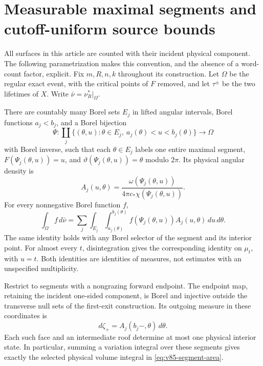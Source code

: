 \section{Measurable maximal segments and cutoff-uniform source bounds}
\label{sec:v85-segments}
All surfaces in this article are counted with their incident physical
component. The following parametrization makes this convention, and the
absence of a word-count factor, explicit. Fix $m,R,n,k$ throughout its
construction. Let $\Omega$ be the regular exact event, with the critical
points of $F$ removed, and let $\tau^\pm$ be the two lifetimes of $X$.
Write $\bar\nu=\nu_R^*|_\Omega$.

\begin{theorem}
\label{thm:v85-segment-map}
There are countably many Borel sets $E_j$ in lifted angular intervals,
Borel functions $a_j<b_j$, and a Borel bijection
\begin{equation}\label{eq:v85-segment-map}
 \Psi:\coprod_j\{(\theta,u):\theta\in E_j,\ a_j(\theta)<u<b_j(\theta)\}
                  \longrightarrow\Omega
\end{equation}
with Borel inverse, such that each $\theta\in E_j$ labels one entire
maximal segment, $F(\Psi_j(\theta,u))=u$, and
$\vartheta(\Psi_j(\theta,u))=\theta$ modulo $2\pi$. Its physical
angular density is
\[
 A_j(u,\theta)=\frac{\omega(\Psi_j(\theta,u))}
                         {4\pi c_*\chi(\Psi_j(\theta,u))}.
\]
For every nonnegative Borel function $f$,
\begin{equation}\label{eq:v85-segment-area}
 \int_\Omega f\,d\bar\nu
   =\sum_j\int_{E_j}\int_{a_j(\theta)}^{b_j(\theta)}
           f(\Psi_j(\theta,u))A_j(u,\theta)\,du\,d\theta.
\end{equation}
The same identity holds with any Borel selector of the segment and its
interior point. For almost every $t$, disintegration gives the
corresponding identity on $\mu_t$, with $u=t$. Both identities are
identities of measures, not estimates with an unspecified multiplicity.

Restrict to segments with a nongrazing forward endpoint. The endpoint
map, retaining the incident one-sided component, is Borel and injective
outside the transverse null sets of the first-exit construction. Its
outgoing measure in these coordinates is
\begin{equation}\label{eq:v85-segment-face}
                    d\zeta_+=A_j(b_j-,\theta)\,d\theta.
\end{equation}
Each such face and an intermediate roof determine at most one physical
interior state. In particular, summing a variation integral over these
segments gives exactly the selected physical volume integral in
\eqref{eq:v85-segment-area}.
\end{theorem}
